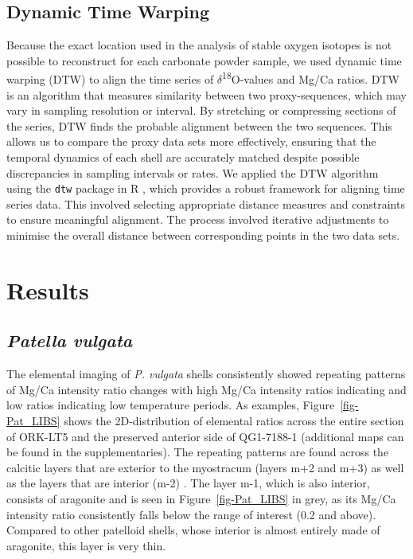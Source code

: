 \documentclass[
  authoryear,
  preprint,
  3p]{elsarticle}
\begin{document}
\subsection{Dynamic Time Warping}\label{dynamic-time-warping}

Because the exact location used in the analysis of stable oxygen
isotopes is not possible to reconstruct for each carbonate powder
sample, we used dynamic time warping (DTW) to align the time series of
\(\delta\)\textsuperscript{18}O-values and Mg/Ca ratios. DTW is an
algorithm that measures similarity between two proxy-sequences, which
may vary in sampling resolution or interval. By stretching or
compressing sections of the series, DTW finds the probable alignment
between the two sequences. This allows us to compare the proxy data sets
more effectively, ensuring that the temporal dynamics of each shell are
accurately matched despite possible discrepancies in sampling intervals
or rates. We applied the DTW algorithm using the \texttt{dtw} package in
R \citep{Giorgino2009-sj, R_Core_Team2020-mk}, which provides a robust
framework for aligning time series data. This involved selecting
appropriate distance measures and constraints to ensure meaningful
alignment. The process involved iterative adjustments to minimise the
overall distance between corresponding points in the two data sets.

\section{Results}\label{Results}

\subsection{\texorpdfstring{\emph{Patella
vulgata}}{Patella vulgata}}\label{patella-vulgata}

The elemental imaging of \emph{P. vulgata} shells consistently showed
repeating patterns of Mg/Ca intensity ratio changes with high Mg/Ca
intensity ratios indicating and low ratios indicating low temperature
periods. As examples, Figure~\ref{fig-Pat_LIBS} shows the
2D-distribution of elemental ratios across the entire section of ORK-LT5
and the preserved anterior side of QG1-7188-1 (additional maps can be
found in the supplementaries). The repeating patterns are found across
the calcitic layers that are exterior to the myostracum (layers m+2 and
m+3) as well as the layers that are interior (m-2)
\citep{Fenger2007-gf}. The layer m-1, which is also interior, consists
of aragonite and is seen in Figure~\ref{fig-Pat_LIBS} in grey, as its
Mg/Ca intensity ratio consistently falls below the range of interest
(0.2 and above). Compared to other patelloid shells, whose interior is
almost entirely made of aragonite, this layer is very thin.
\end{document}

